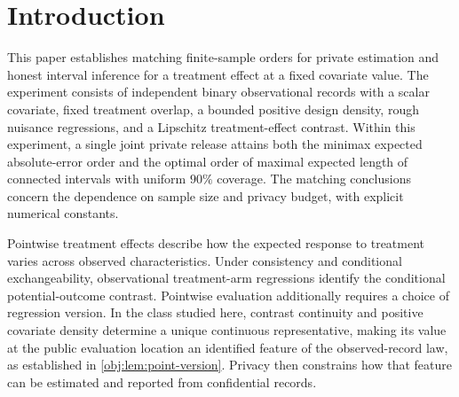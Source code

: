 \begin{abstract}
We characterize the optimal accuracy of pure differentially private pointwise treatment-effect estimation and honest interval inference from independent binary observational records. The model has a scalar covariate on \([0,1]\), an unknown measurable density between \(1/2\) and \(3/2\), treatment probabilities between \(1/4\) and \(3/4\), propensity and control regressions of H\"older order \(1/10\), and a Lipschitz treatment contrast, all with regularity radius \(3\). Within this model, consistency and conditional exchangeability identify the causal contrast almost surely; continuity and positive design density identify its value at the fixed covariate location \(1/2\). For sample size \(n\ge2\) and pure replacement privacy budget \(0<\epsilon\le1\), both minimax expected absolute error and minimax maximal expected length of connected intervals with uniform finite-sample \(90\%\) coverage have order
\[
\min\left\{1,\max\left\{
n^{-1/4},(n^2\epsilon)^{-1/7},(n\epsilon)^{-1/2}
\right\}\right\}.
\]
A count-weighted within-cell pair ratio attains these orders through one joint Laplace release and public tuning. Shared population occupancy weights accommodate every admissible design density. Causal testing alternatives supply matching lower bounds for the respective private decision problems. Along admissible privacy-budget sequences, vanishing optimal risk and honest expected length are equivalent to \(n\epsilon\to\infty\).
\end{abstract}

\section{Introduction}

This paper establishes matching finite-sample orders for private estimation and honest interval inference for a treatment effect at a fixed covariate value. The experiment consists of independent binary observational records with a scalar covariate, fixed treatment overlap, a bounded positive design density, rough nuisance regressions, and a Lipschitz treatment-effect contrast. Within this experiment, a single joint private release attains both the minimax expected absolute-error order and the optimal order of maximal expected length of connected intervals with uniform \(90\%\) coverage. The matching conclusions concern the dependence on sample size and privacy budget, with explicit numerical constants.

Pointwise treatment effects describe how the expected response to treatment varies across observed characteristics. Under consistency and conditional exchangeability, observational treatment-arm regressions identify the conditional potential-outcome contrast. Pointwise evaluation additionally requires a choice of regression version. In the class studied here, contrast continuity and positive covariate density determine a unique continuous representative, making its value at the public evaluation location an identified feature of the observed-record law, as established in \cref{obj:lem:point-version}. Privacy then constrains how that feature can be estimated and reported from confidential records.

